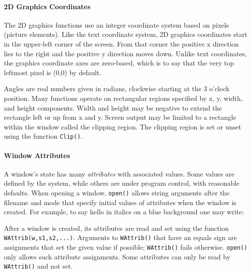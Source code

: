 \paragraph{2D Graphics Coordinates}

The 2D graphics functions use an integer coordinate system based on
pixels (picture elements). Like the text coordinate system, 2D
graphics coordinates start in the upper-left corner of the screen.
From that corner the positive x direction lies to the right and the
positive y direction moves down. Unlike text coordinates, the graphics
coordinate axes are zero-based, which is to say that the very top
leftmost pixel is (0,0) by default.

Angles are real numbers given in radians, clockwise starting at the 3
o'clock position. Many functions operate on rectangular regions
specified by x, y, width, and height components.  Width and height may
be negative to extend the rectangle left or up from x and y. Screen
output may be limited to a rectangle within the window called the
clipping region. The clipping region is set or unset using the
function \texttt{Clip()}.

\paragraph{Window Attributes}
A window's state has many \textit{attributes} with associated
values. Some values are defined by the system, while others are under
program control, with reasonable defaults. When opening a window,
\texttt{open()} allows string arguments after the filename and mode
that specify initial values of attributes when the window is
created. For example, to say hello in italics on a blue background one
may write:


After a window is created, its attributes are read and set using the
function \texttt{WAttrib(w,s1,s2,...)}. Arguments to
\texttt{WAttrib()} that have an equals sign are assignments that set
the given value if possible; \texttt{WAttrib()} fails otherwise.
\texttt{open()} only allows such attribute assignments. Some
attributes can only be read by \texttt{WAttrib()} and not set.

